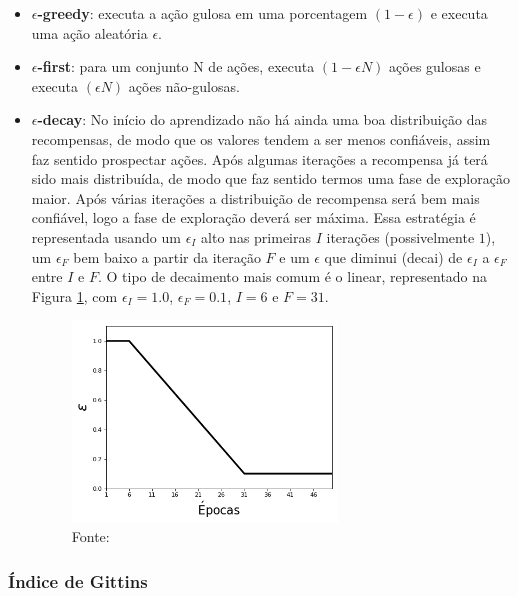 \documentclass{article}
\begin{document}
            \begin{itemize}
                \item \textbf{$\epsilon$-greedy}: executa a ação gulosa em uma porcentagem $(1-\epsilon)$ e executa uma ação aleatória $\epsilon$.
                \item \textbf{$\epsilon$-first}: para um conjunto N de ações, executa $(1 - \epsilon N)$ ações gulosas e executa $(\epsilon N)$ ações não-gulosas.
                \item \textbf{$\epsilon$-decay}: No início do aprendizado não há ainda uma boa distribuição das recompensas, de modo que os valores tendem a ser menos confiáveis, assim faz sentido prospectar ações. Após algumas iterações a recompensa já terá sido mais distribuída, de modo que faz sentido termos uma fase de exploração maior. Após várias iterações a distribuição de recompensa será bem mais confiável, logo a fase de exploração deverá ser máxima. Essa estratégia é representada usando um $\epsilon_{I}$ alto nas primeiras $I$ iterações (possivelmente $1$), um $\epsilon_{F}$ bem baixo a partir da iteração $F$ e um $\epsilon$ que diminui (decai) de $\epsilon_{I}$ a $\epsilon_{F}$ entre $I$ e $F$. O tipo de decaimento mais comum é o linear, representado na Figura \ref{fig:epsilon-decay}, com $\epsilon_{I} = 1.0$, $\epsilon_{F} = 0.1$, $I = 6$ e $F = 31$.
                
                \begin{figure}[ht]
                    \centering
                    \includegraphics[width=200pt]{epsilon-decay.png}
                    \caption{Fonte:}
                    \label{fig:epsilon-decay}
                \end{figure}
            \end{itemize}
        
        \subsubsection{Índice de Gittins}
\end{document}
